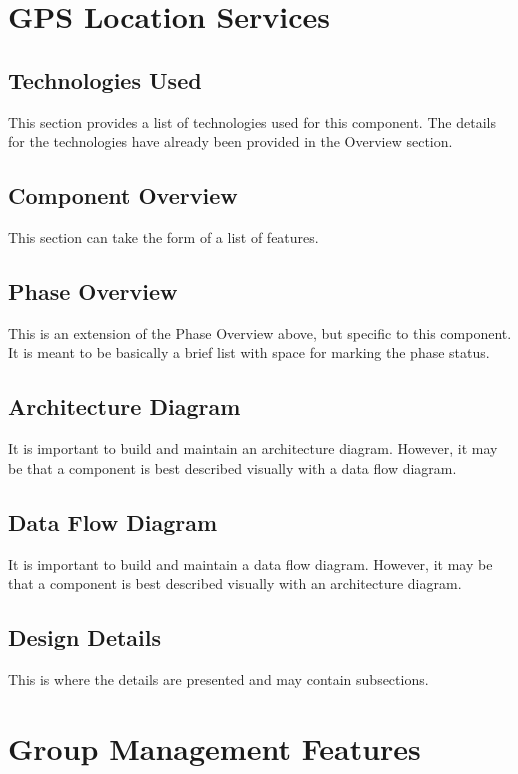 \section{GPS Location Services}

\subsection{Technologies  Used}
This section provides a list of technologies used for this component.  The details 
for the technologies have already been provided in the Overview section. 

\subsection{Component  Overview}
This section can take the form of a list of features. 

\subsection{Phase Overview}
This is an extension of the Phase Overview above, but specific to this component. 
 It is meant to be basically a brief list with space for marking the phase status. 

\subsection{ Architecture  Diagram}
It is important to build and maintain an architecture diagram.  However, it may 
be that a component is best described visually with a data flow diagram. 


\subsection{Data Flow Diagram}
It is important to build and maintain a data flow diagram.  However, it may be 
that a component is best described visually with an architecture diagram. 


\subsection{Design Details}
This is where the details are presented and may contain subsections. 


\section{Group Management Features }


